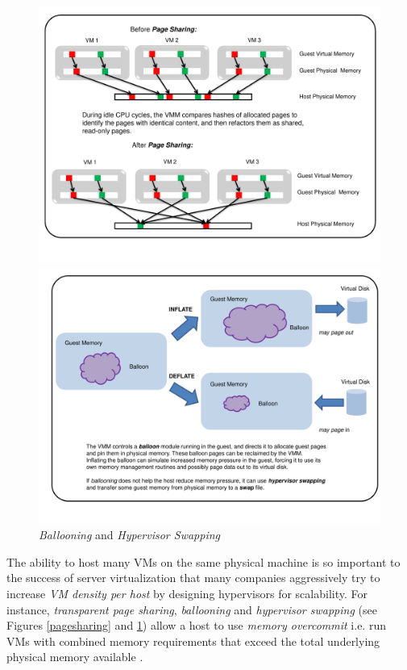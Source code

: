 \begin{figure}[p]
  \centering
  \includegraphics[scale=0.55, trim=1cm 0cm 2cm 0cm]{pagesharing.pdf}  
  \caption[{\em Transparent Page Sharing}]%
          {{\em Transparent Page Sharing}}
          \label{pagesharing}
  \includegraphics[scale=0.58, trim=1cm 0cm 1cm 0cm]{balloon.pdf}   
  \caption[{\em Ballooning} and {\em Hypervisor Swapping}]%
          {{\em Ballooning} and {\em Hypervisor Swapping}}
          \label{balloon}
\end{figure}


The ability to host many VMs
on the same physical machine is so important to the success
of server virtualization that many companies 
aggressively try to increase {\em VM density per host} by
designing hypervisors for scalability.
For instance, {\em transparent page sharing}, {\em ballooning}
and {\em hypervisor swapping} (see Figures \ref{pagesharing} and \ref{balloon})
allow a host to use {\em memory overcommit} i.e. run VMs with
combined memory requirements
that exceed the total underlying physical memory
available \cite{waldspurger2002memory}. 

